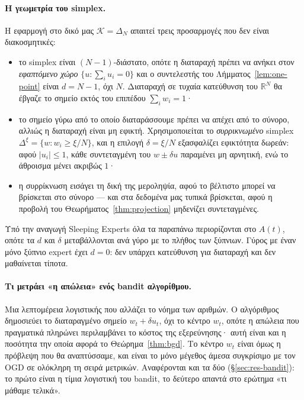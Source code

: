 \documentclass[12pt,a4paper,oneside]{report}
\renewcommand{\_}{\oldunderscore\allowbreak}
\theoremstyle{definition}
\theoremstyle{plain}
\theoremstyle{remark}
\begin{document}
\paragraph{Η γεωμετρία του simplex.} Η εφαρμογή στο δικό μας $\mathcal{K}=\Delta_N$ απαιτεί
τρεις προσαρμογές που δεν είναι διακοσμητικές:

\begin{itemize}
  \item το simplex είναι $(N\!-\!1)$-διάστατο, οπότε η διαταραχή πρέπει να ανήκει στον
        \emph{εφαπτόμενο χώρο} $\{u : \sum_i u_i = 0\}$ και ο συντελεστής του
        Λήμματος~\ref{lem:one-point} είναι $d = N-1$, όχι $N$. Διαταραχή σε τυχαία
        κατεύθυνση του $\mathbb{R}^N$ θα έβγαζε το σημείο εκτός του επιπέδου
        $\sum_i w_i = 1$·
  \item το σημείο γύρω από το οποίο διαταράσσουμε πρέπει να απέχει από το σύνορο, αλλιώς η
        διαταραχή είναι μη εφικτή. Χρησιμοποιείται το \emph{συρρικνωμένο} simplex
        $\Delta^{\xi} = \{w : w_i \geq \xi/N\}$, και η επιλογή $\delta = \xi/N$ εξασφαλίζει
        εφικτότητα δωρεάν: αφού $|u_i|\leq 1$, κάθε συντεταγμένη του $w \pm \delta u$
        παραμένει μη αρνητική, ενώ το άθροισμα μένει ακριβώς $1$·
  \item η συρρίκνωση εισάγει τη δική της μεροληψία, αφού το βέλτιστο μπορεί να βρίσκεται στο
        σύνορο --- και στα δεδομένα μας τυπικά βρίσκεται, αφού η προβολή του
        Θεωρήματος~\ref{thm:projection} μηδενίζει συντεταγμένες.
\end{itemize}

Υπό την αναγωγή Sleeping Experts όλα τα παραπάνω περιορίζονται στο $A(t)$, οπότε τα $d$ και
$\delta$ μεταβάλλονται ανά γύρο με το πλήθος των ξύπνιων. Γύρος με έναν μόνο ξύπνιο expert
έχει $d=0$: δεν υπάρχει κατεύθυνση για διαταραχή και δεν μαθαίνεται τίποτα.

\paragraph{Τι μετράει «η απώλεια» ενός bandit αλγορίθμου.} Μια λεπτομέρεια λογιστικής που
αλλάζει το νόημα των αριθμών. Ο αλγόριθμος δημοσιεύει το διαταραγμένο σημείο
$w_t + \delta u_t$, όχι το κέντρο $w_t$, οπότε η απώλεια που πραγματικά πληρώνει
περιλαμβάνει το κόστος της εξερεύνησης· αυτή είναι και η ποσότητα την οποία αφορά το
Θεώρημα~\ref{thm:bgd}. Το κέντρο $w_t$ είναι όμως η πρόβλεψη που θα αναπτύσσαμε, και είναι
το μόνο μέγεθος άμεσα συγκρίσιμο με τον OGD σε ολόκληρη τη σειρά μετρικών. Αναφέρονται και
τα δύο (\S\ref{sec:res-bandit}): το πρώτο είναι η τίμια λογιστική του bandit, το δεύτερο
απαντά στο ερώτημα «τι μάθαμε τελικά».
\end{document}
